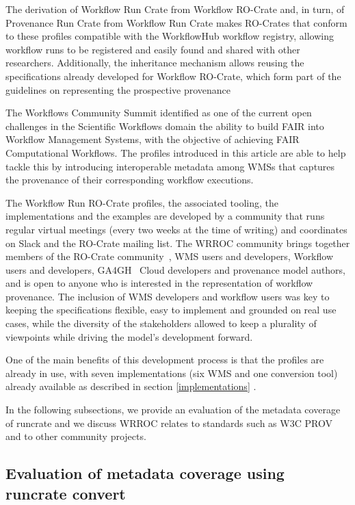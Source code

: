 \documentclass[10pt,letterpaper]{article}
\begin{document}
The derivation of Workflow Run Crate from Workflow RO-Crate and, in turn, of Provenance Run Crate from Workflow Run Crate makes RO-Crates that conform to these profiles compatible with the WorkflowHub workflow registry, allowing workflow runs to be registered and easily found and shared with other researchers. Additionally, the inheritance mechanism allows reusing the specifications already developed for Workflow RO-Crate, which form part of the guidelines on representing the prospective provenance

The Workflows Community Summit \cite{Ferreira 2023} identified as one of the current open challenges in the Scientific Workflows domain the ability to build FAIR into Workflow Management Systems, with the objective of achieving FAIR Computational Workflows. The profiles introduced in this article are able to help tackle this by introducing interoperable metadata among WMSs that captures the provenance of their corresponding workflow executions.

The Workflow Run RO-Crate profiles, the associated tooling, the implementations and the examples are developed by a community that runs regular virtual meetings (every two weeks at the time of writing) and coordinates on Slack and the RO-Crate mailing list.
The WRROC community brings together members of the RO-Crate community~\cite{Soiland-Reyes 2022a}, WMS users and developers, Workflow users and developers, GA4GH~\cite{Rehm 2021} Cloud developers and provenance model authors, and is open to anyone who is interested in the representation of workflow provenance.
The inclusion of WMS developers and workflow users was key to keeping the specifications flexible, easy to implement and grounded on real use cases, while the diversity of the stakeholders allowed to keep a plurality of viewpoints while driving the model's development forward.

One of the main benefits of this development process is that the profiles are already in use, with seven implementations (six WMS and one conversion tool) already available as described in section \ref{implementations} .

In the following subsections, we provide an evaluation of the metadata coverage of runcrate and we discuss WRROC relates to standards such as W3C PROV and to other community projects.


\subsection{Evaluation of metadata coverage using runcrate convert}
\end{document}
